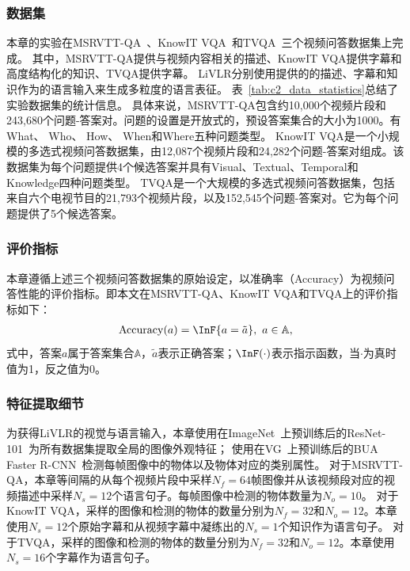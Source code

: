 

\subsubsection{数据集}
本章的实验在MSRVTT-QA~\cite{xu2017video}、KnowIT VQA~\cite{garcia2020knowit}和TVQA~\cite{lei2018tvqa}三个视频问答数据集上完成。
其中，MSRVTT-QA提供与视频内容相关的描述、KnowIT VQA提供字幕和高度结构化的知识、TVQA提供字幕。
LiVLR分别使用提供的的描述、字幕和知识作为的语言输入来生成多粒度的语言表征。
表~\ref{tab:c2_data_statistics}总结了实验数据集的统计信息。
具体来说，MSRVTT-QA包含约10,000个视频片段和243,680个问题-答案对。问题的设置是开放式的，预设答案集合的大小为1000。有What、 Who、 How、 When和Where五种问题类型。
KnowIT VQA是一个小规模的多选式视频问答数据集，由12,087个视频片段和24,282个问题-答案对组成。该数据集为每个问题提供4个候选答案并具有Visual、Textual、Temporal和Knowledge四种问题类型。
TVQA是一个大规模的多选式视频问答数据集，包括来自六个电视节目的21,793个视频片段，以及152,545个问题-答案对。它为每个问题提供了5个候选答案。




\subsubsection{评价指标}
本章遵循上述三个视频问答数据集的原始设定，以准确率（Accuracy）为视频问答性能的评价指标。即本文在MSRVTT-QA、KnowIT VQA和TVQA上的评价指标如下：
\begin{equation}
\begin{aligned}
\mathrm{Accuracy} (a) = \InF \{a = \tilde{a}\}, ~a \in \mathbb{A},  
\end{aligned}
\end{equation} 
式中，答案$a$属于答案集合$\mathbb{A}$，$\tilde{a}$表示正确答案；$\InF(\cdot)$表示指示函数，当$\cdot$为真时值为1，反之值为0。


\subsubsection{特征提取细节}
为获得LiVLR的视觉与语言输入，本章使用在ImageNet~\cite{deng2009imagenet}上预训练后的ResNet-101~\cite{he2016deep}为所有数据集提取全局的图像外观特征；
使用在VG~\cite{krishna2017visual}上预训练后的BUA Faster R-CNN~\cite{anderson2018bottom}检测每帧图像中的物体以及物体对应的类别属性。
对于MSRVTT-QA，本章等间隔的从每个视频片段中采样$N_f=64$帧图像并从该视频段对应的视频描述中采样$N_s=12$个语言句子。每帧图像中检测的物体数量为$N_o=10$。
对于KnowIT VQA，采样的图像和检测的物体的数量分别为$N_f=32$和$N_o=12$。本章使用$N_s=12$个原始字幕和从视频字幕中凝练出的$N_s=1$个知识作为语言句子。
对于TVQA，采样的图像和检测的物体的数量分别为$N_f=32$和$N_o=12$。本章使用$N_s=16$个字幕作为语言句子。


